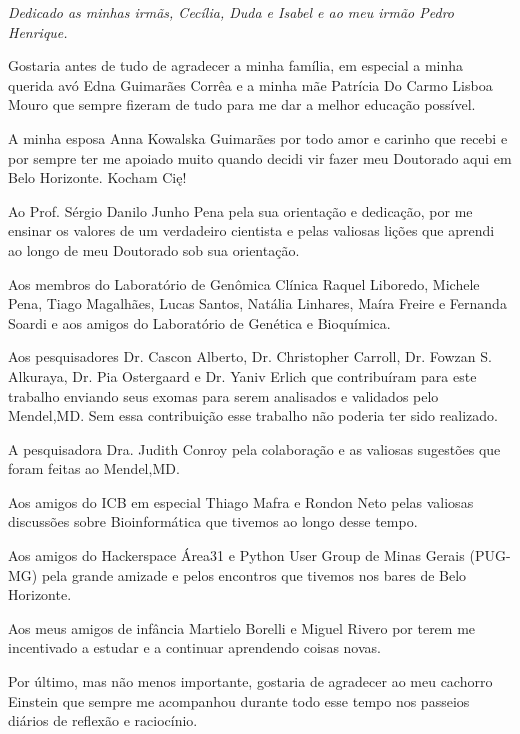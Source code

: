 \documentclass[
	12pt,				%
	openany,			%
	oneside,			%
	a4paper,			%
	english,			%
	brazil,				%
	]{abntex2}
\begin{document}
\begin{dedicatoria}
 \vspace*{\fill}
 \centering
 \noindent
 \textit{Dedicado as minhas irmãs, Cecília, Duda e Isabel e ao meu irmão Pedro Henrique.} \vspace*{\fill}
\end{dedicatoria}
% 


\begin{agradecimentos}

Gostaria antes de tudo de agradecer a minha família, em especial a minha querida avó Edna Guimarães Corrêa e a minha mãe Patrícia Do Carmo Lisboa Mouro que sempre fizeram de tudo para me dar a melhor educação possível.

A minha esposa Anna Kowalska Guimarães por todo amor e carinho que recebi e por sempre ter me apoiado muito quando decidi vir fazer meu Doutorado aqui em Belo Horizonte. Kocham Cię!

Ao Prof. Sérgio Danilo Junho Pena pela sua orientação e dedicação, por me ensinar os valores de um verdadeiro cientista e pelas valiosas lições que aprendi ao longo de meu Doutorado sob sua orientação.

Aos membros do Laboratório de Genômica Clínica Raquel Liboredo, Michele Pena, Tiago Magalhães, Lucas Santos, Natália Linhares, Maíra Freire e Fernanda Soardi e aos amigos do Laboratório de Genética e Bioquímica.

Aos pesquisadores Dr. Cascon Alberto, Dr. Christopher Carroll, Dr. Fowzan S. Alkuraya, Dr. Pia Ostergaard e Dr. Yaniv Erlich que contribuíram para este trabalho enviando seus exomas para serem analisados e validados pelo Mendel,MD. Sem essa contribuição esse trabalho não poderia ter sido realizado.

A pesquisadora Dra. Judith Conroy pela colaboração e as valiosas sugestões que foram feitas ao Mendel,MD.

Aos amigos do ICB em especial Thiago Mafra e Rondon Neto pelas valiosas discussões sobre Bioinformática que tivemos ao longo desse tempo.

Aos amigos do Hackerspace Área31 e Python User Group de Minas Gerais (PUG-MG) pela grande amizade e pelos encontros que tivemos nos bares de Belo Horizonte.

Aos meus amigos de infância Martielo Borelli e Miguel Rivero por terem me incentivado a estudar e a continuar aprendendo coisas novas.

Por último, mas não menos importante, gostaria de agradecer ao meu cachorro Einstein que sempre me acompanhou durante todo esse tempo nos passeios diários de reflexão e raciocínio.

\end{agradecimentos}
\end{document}
